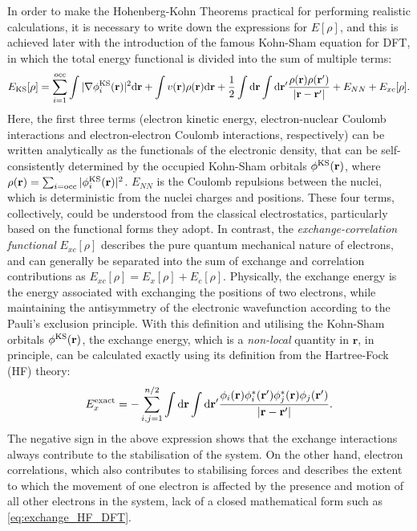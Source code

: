 In order to make the Hohenberg-Kohn Theorems practical for performing realistic calculations, it is  necessary to write down the expressions for $E[\rho]$, and this is achieved later\cite{kohn1965self} with the introduction of the famous Kohn-Sham equation for DFT, in which the total energy functional is divided into the sum of multiple terms:
\begin{equation}\label{eq:KS_eqn}
E_{\mbox{\scriptsize{KS}}}[\rho]=\sum_{i=1}^{occ}\int\vert \nabla\phi^{\mbox{\scriptsize{KS}}}_i (\mathbf{r})\vert^2 \mbox{d}\mathbf{r} + \int v(\mathbf{r})\rho(\mathbf{r})\mbox{d}\mathbf{r}
+\frac{1}{2}\int \mbox{d}\mathbf{r} \int \mbox{d}\mathbf{r}^\prime \frac{\rho(\mathbf{r})\rho(\mathbf{r}^\prime)}{\left\vert \mathbf{r}-\mathbf{r}^\prime\right\vert} +E_{NN}+E_{xc}[\rho].
\end{equation}
Here, the first three terms (electron kinetic energy, electron-nuclear Coulomb interactions and electron-electron Coulomb interactions, respectively) can be written analytically as the functionals of the electronic density, that can be self-consistently determined by the occupied Kohn-Sham orbitals $\phi^{\mbox{\scriptsize{KS}}}(\mathbf{r})$, where $\rho(\mathbf{r})=\sum_{i=\mbox{\scriptsize{occ}}}|\phi^{\mbox{\scriptsize{KS}}}_i(\mathbf{r})|^2$. $E_{NN}$ is the Coulomb repulsions between the nuclei, which is deterministic from the nuclei charges and positions. These four terms, collectively, could be understood from the classical electrostatics, particularly based on the functional forms they adopt. In contrast, the \emph{exchange-correlation functional} $E_{xc}[\rho]$ describes the pure quantum mechanical nature of electrons, and can generally be separated into the sum of exchange and correlation contributions as $E_{xc}[\rho]=E_{x}[\rho]+E_{c}[\rho]$. 
Physically, the exchange energy is the energy associated with exchanging the positions of two electrons, while maintaining the antisymmetry of the electronic wavefunction according to the Pauli's exclusion principle. With this definition and utilising the Kohn-Sham orbitals $\phi^{\mbox{\scriptsize{KS}}}(\mathbf{r})$, the exchange energy, which is a \emph{non-local} quantity in $\bm{r}$, in principle, can be calculated exactly  using its definition from the Hartree-Fock (HF) theory:\cite{staroverov2012density}
\begin{equation}\label{eq:exchange_HF_DFT}
E_{x}^{\mbox{\scriptsize{exact}}}=-\sum_{i,j=1}^{n/2}\int \mbox{d}\mathbf{r}\int \mbox{d}\mathbf{r}^\prime  \frac{\phi_{i}(\mathbf{r}) \phi_{i}^{*}(\mathbf{r}^\prime) \phi_{j}^{*}(\mathbf{r})\phi_{j}(\mathbf{r}^\prime)}{\left\vert \mathbf{r}-\mathbf{r}^\prime\right\vert}.
\end{equation}
The negative sign in the above expression shows that the exchange interactions always contribute to the stabilisation of the system. On the other hand, electron correlations, which also contributes to stabilising forces and describes the extent to which the movement of one electron is affected by the presence and motion of all other electrons in the system, lack of a closed mathematical form such as \cref{eq:exchange_HF_DFT}. 

